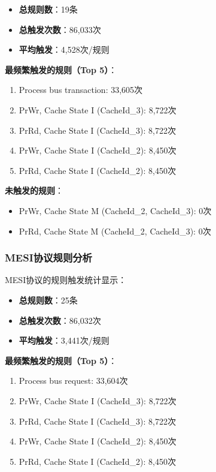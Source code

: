 \documentclass[a4paper]{article}
\begin{document}
\begin{itemize}
    \item \textbf{总规则数}：19条
    \item \textbf{总触发次数}：86,033次
    \item \textbf{平均触发}：4,528次/规则
\end{itemize}

\textbf{最频繁触发的规则（Top 5）}：
\begin{enumerate}
    \item Process bus transaction: 33,605次
    \item PrWr, Cache State I (CacheId\_3): 8,722次
    \item PrRd, Cache State I (CacheId\_3): 8,722次
    \item PrWr, Cache State I (CacheId\_2): 8,450次
    \item PrRd, Cache State I (CacheId\_2): 8,450次
\end{enumerate}

\textbf{未触发的规则}：
\begin{itemize}
    \item PrWr, Cache State M (CacheId\_2, CacheId\_3): 0次
    \item PrRd, Cache State M (CacheId\_2, CacheId\_3): 0次
\end{itemize}

\subsubsection{MESI协议规则分析}

MESI协议的规则触发统计显示：

\begin{itemize}
    \item \textbf{总规则数}：25条
    \item \textbf{总触发次数}：86,032次
    \item \textbf{平均触发}：3,441次/规则
\end{itemize}

\textbf{最频繁触发的规则（Top 5）}：
\begin{enumerate}
    \item Process bus request: 33,604次
    \item PrWr, Cache State I (CacheId\_3): 8,722次
    \item PrRd, Cache State I (CacheId\_3): 8,722次
    \item PrWr, Cache State I (CacheId\_2): 8,450次
    \item PrRd, Cache State I (CacheId\_2): 8,450次
\end{enumerate}
\end{document}

